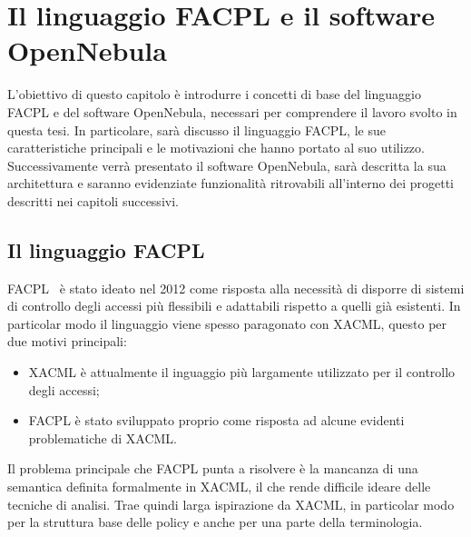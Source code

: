 \chapter{Il linguaggio FACPL e il software OpenNebula}
\label{cap:capitolo2}
L'obiettivo di questo capitolo è introdurre i concetti di base del linguaggio FACPL e del software OpenNebula, necessari per comprendere il lavoro svolto in questa tesi. In particolare, sarà discusso il linguaggio FACPL, le sue caratteristiche principali e le motivazioni che hanno portato al suo utilizzo. Successivamente verrà presentato il software OpenNebula, sarà descritta la sua architettura e saranno evidenziate funzionalità ritrovabili all'interno dei progetti descritti nei capitoli successivi.\par
\section{Il linguaggio FACPL}
FACPL~\cite{FAPCLTesi} è stato ideato nel 2012 come risposta alla necessità di disporre di sistemi di controllo degli accessi più flessibili e adattabili rispetto a quelli già esistenti. In particolar modo il linguaggio viene spesso paragonato con XACML, questo per due motivi principali: 
\begin{itemize}
    \item XACML è attualmente il inguaggio più largamente utilizzato per il controllo degli accessi;
    \item FACPL è stato sviluppato proprio come risposta ad alcune evidenti problematiche di XACML.
\end{itemize}
Il problema principale che FACPL punta a risolvere è la mancanza di una semantica definita formalmente in XACML, il che rende difficile ideare delle tecniche di analisi. Trae quindi larga ispirazione da XACML, in particolar modo per la struttura base delle policy e anche per una parte della terminologia.\par

